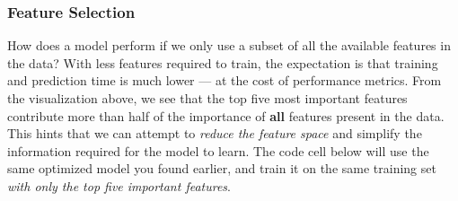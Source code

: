 \documentclass[11pt]{article}
\begin{document}
    \subsubsection{Feature Selection}\label{feature-selection}

How does a model perform if we only use a subset of all the available
features in the data? With less features required to train, the
expectation is that training and prediction time is much lower --- at
the cost of performance metrics. From the visualization above, we see
that the top five most important features contribute more than half of
the importance of \textbf{all} features present in the data. This hints
that we can attempt to \emph{reduce the feature space} and simplify the
information required for the model to learn. The code cell below will
use the same optimized model you found earlier, and train it on the same
training set \emph{with only the top five important features}.
\end{document}
